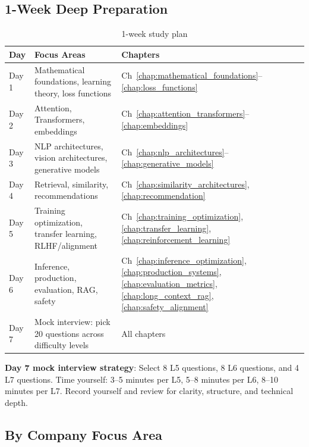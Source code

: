 \subsection{1-Week Deep Preparation}

\begin{table}[H]
\centering
\caption{1-week study plan}
\begin{tabularx}{\textwidth}{lXl}
\toprule
\textbf{Day} & \textbf{Focus Areas} & \textbf{Chapters} \\
\midrule
Day 1 & Mathematical foundations, learning theory, loss functions & Ch~\ref{chap:mathematical_foundations}--\ref{chap:loss_functions} \\
Day 2 & Attention, Transformers, embeddings & Ch~\ref{chap:attention_transformers}--\ref{chap:embeddings} \\
Day 3 & NLP architectures, vision architectures, generative models & Ch~\ref{chap:nlp_architectures}--\ref{chap:generative_models} \\
Day 4 & Retrieval, similarity, recommendations & Ch~\ref{chap:similarity_architectures}, \ref{chap:recommendation} \\
Day 5 & Training optimization, transfer learning, RLHF/alignment & Ch~\ref{chap:training_optimization}, \ref{chap:transfer_learning}, \ref{chap:reinforcement_learning} \\
Day 6 & Inference, production, evaluation, RAG, safety & Ch~\ref{chap:inference_optimization}, \ref{chap:production_systems}, \ref{chap:evaluation_metrics}, \ref{chap:long_context_rag}, \ref{chap:safety_alignment} \\
Day 7 & Mock interview: pick 20 questions across difficulty levels & All chapters \\
\bottomrule
\end{tabularx}
\end{table}

\textbf{Day 7 mock interview strategy}: Select 8 L5 questions, 8 L6 questions, and 4 L7 questions. Time yourself: 3--5 minutes per L5, 5--8 minutes per L6, 8--10 minutes per L7. Record yourself and review for clarity, structure, and technical depth.

\subsection{By Company Focus Area}

